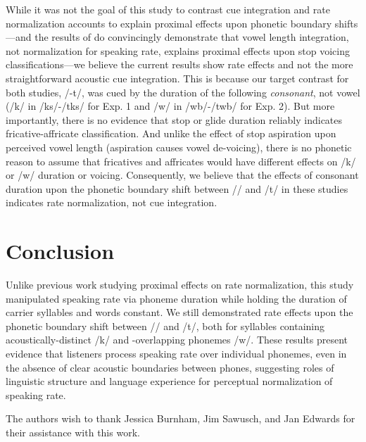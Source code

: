 While it was not the goal of this study to contrast cue integration and rate normalization accounts to explain proximal effects upon phonetic boundary shifts---and the results of \citet{toscanoCueintegrationContextEffects2012} do convincingly demonstrate that vowel length integration, not normalization for speaking rate, explains proximal effects upon stop voicing classifications---we believe the current results show rate effects and not the more straightforward acoustic cue integration. This is because our target contrast for both studies, /\textesh-t\textesh/, was cued by the duration of the following \textit{consonant}, not vowel (/k/ in /\textesh k\textscripta s/-/t\textesh k\textscripta s/ for Exp. 1 and /w/ in /\textesh w\textsci b/-/t\textesh w\textsci b/ for Exp. 2). But more importantly, there is no evidence that stop or glide duration reliably indicates fricative-affricate classification. And unlike the effect of stop aspiration upon perceived vowel length (aspiration causes vowel de-voicing), there is no phonetic reason to assume that fricatives and affricates would have different effects on /k/ or /w/ duration or voicing. Consequently, we believe that the effects of consonant duration upon the phonetic boundary shift between /\textesh/ and /t\textesh/ in these studies indicates rate normalization, not cue integration. 

\section{Conclusion}

Unlike previous work studying proximal effects on rate normalization, this study manipulated speaking rate via phoneme duration while holding the duration of carrier syllables and words constant. We still demonstrated rate effects upon the phonetic boundary shift between /\textesh/ and /t\textesh/, both for syllables containing acoustically-distinct /k\textscripta/ and -overlapping phonemes /w\textsci/. These results present evidence that listeners process speaking rate over individual phonemes, even in the absence of clear acoustic boundaries between phones, suggesting roles of linguistic structure and language experience for perceptual normalization of speaking rate.  



\begin{acknowledgements}
The authors wish to thank Jessica Burnham, Jim Sawusch, and Jan Edwards for their assistance with this work. 
\end{acknowledgements}

